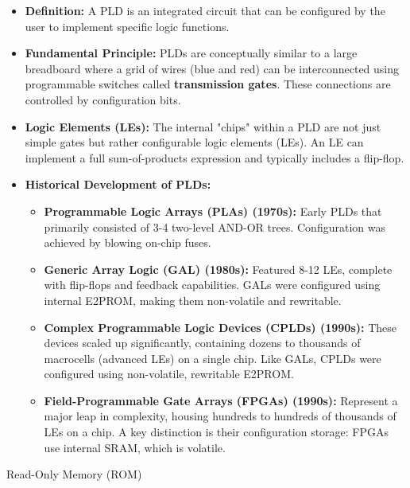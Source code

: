 \documentclass{article}
\begin{document}
\begin{itemize}
    \item \textbf{Definition:} A PLD is an integrated circuit that can be configured by the user to implement specific logic functions.
    \item \textbf{Fundamental Principle:} PLDs are conceptually similar to a large breadboard where a grid of wires (blue and red) can be interconnected using programmable switches called \textbf{transmission gates}. These connections are controlled by configuration bits.
    \item \textbf{Logic Elements (LEs):} The internal "chips" within a PLD are not just simple gates but rather configurable logic elements (LEs). An LE can implement a full sum-of-products expression and typically includes a flip-flop.
    \item \textbf{Historical Development of PLDs:}
    \begin{itemize}
        \item \textbf{Programmable Logic Arrays (PLAs) (1970s):} Early PLDs that primarily consisted of 3-4 two-level AND-OR trees. Configuration was achieved by blowing on-chip fuses.
        \item \textbf{Generic Array Logic (GAL) (1980s):} Featured 8-12 LEs, complete with flip-flops and feedback capabilities. GALs were configured using internal E2PROM, making them non-volatile and rewritable.
        \item \textbf{Complex Programmable Logic Devices (CPLDs) (1990s):} These devices scaled up significantly, containing dozens to thousands of macrocells (advanced LEs) on a single chip. Like GALs, CPLDs were configured using non-volatile, rewritable E2PROM.
        \item \textbf{Field-Programmable Gate Arrays (FPGAs) (1990s):} Represent a major leap in complexity, housing hundreds to hundreds of thousands of LEs on a chip. A key distinction is their configuration storage: FPGAs use internal SRAM, which is volatile.
    \end{itemize}
\end{itemize}

Read-Only Memory (ROM)
\end{document}
